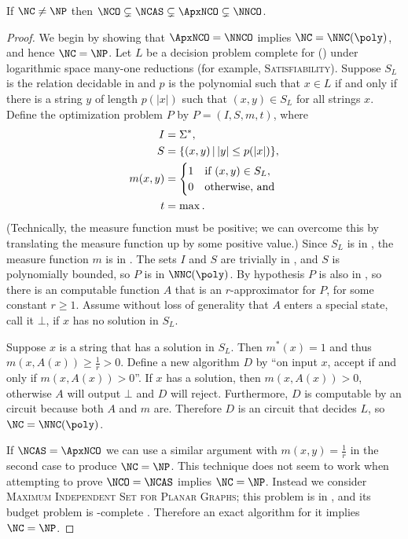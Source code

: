 \documentclass[]{article}
\let\originalleft\left
\let\originalright\right
\renewcommand{\left}{\mathopen{}\mathclose\bgroup\originalleft}
\renewcommand{\right}{\aftergroup\egroup\originalright}
\begin{document}
\begin{theorem}\label{thm:hierarchy}
  If $\NC \neq \NP$ then $\NCO \subsetneq \NCAS \subsetneq \ApxNCO \subsetneq \NNCO$.
\end{theorem}
\begin{proof}
  We begin by showing that $\ApxNCO = \NNCO$ implies $\NC = \NNC(\poly)$, and hence $\NC = \NP$.
  Let $L$ be a decision problem complete for \NNC(\poly) under logarithmic space many-one reductions (for example, \textsc{Satisfiability}).
  Suppose $S_L$ is the relation decidable in \NC{} and $p$ is the polynomial such that $x \in L$ if and only if there is a string $y$ of length $p(|x|)$ such that $(x, y) \in S_L$ for all strings $x$.
  Define the optimization problem $P$ by $P = (I, S, m, t)$, where
  \begin{align*}
    I & = \Sigma^*, \\
    S & = \left\{ (x, y) \,\middle|\, |y| \leq p(|x|) \right\}, \\
    m(x, y) & =
    \begin{cases}
      1 & \text{if } (x, y) \in S_L, \\
      0 & \text{otherwise, and}
    \end{cases} \\
    t & = \max.
  \end{align*}
  (Technically, the measure function must be positive; we can overcome this by translating the measure function up by some positive value.)
  Since $S_L$ is in \NC, the measure function $m$ is in \FNC.
  The sets $I$ and $S$ are trivially in \NC, and $S$ is polynomially bounded, so $P$ is in $\NNC(\poly)$.
  By hypothesis $P$ is also in \ApxNCO, so there is an \NC{} computable function $A$ that is an $r$-approximator for $P$, for some constant $r \geq 1$.
  Assume without loss of generality that $A$ enters a special state, call it $\bot$, if $x$ has no solution in $S_L$.

  Suppose $x$ is a string that has a solution in $S_L$.
  Then $m^*(x) = 1$ and thus $m(x, A(x)) \geq \frac{1}{r} > 0$.
  Define a new algorithm $D$ by ``on input $x$, accept if and only if $m(x, A(x)) > 0$''.
  If $x$ has a solution, then $m(x, A(x)) > 0$, otherwise $A$ will output $\bot$ and $D$ will reject.
  Furthermore, $D$ is computable by an \NC{} circuit because both $A$ and $m$ are.
  Therefore $D$ is an \NC circuit that decides $L$, so $\NC = \NNC(\poly)$.

  If $\NCAS = \ApxNCO$ we can use a similar argument with $m(x, y) = \frac{1}{r}$ in the second case to produce $\NC = \NP$.
  This technique does not seem to work when attempting to prove $\NCO = \NCAS$ implies $\NC = \NP$.
  Instead we consider \textsc{Maximum Independent Set for Planar Graphs}; this problem is in \NCAS{} \cite[Theorem~5.2.1]{dsst97}, and its budget problem is \NP-complete \cite{gj79}.
  Therefore an exact \NC{} algorithm for it implies $\NC = \NP$.
\end{proof}
\end{document}
